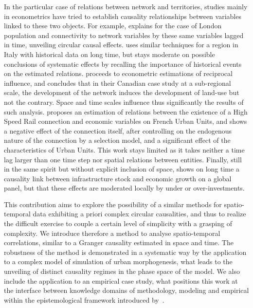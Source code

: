 \documentclass[english]{./sageo}
\begin{document}
In the particular case of relations between network and territories, studies mainly in econometrics have tried to establish causality relationships between variables linked to these two objects. For example, \cite{levinson2008density} explains for the case of London population and connectivity to network variables by these same variables lagged in time, unveiling circular causal effects. \cite{doi10.1068/b39089} uses similar techniques for a region in Italy with historical data on long time, but stays moderate on possible conclusions of systematic effects by recalling the importance of historical events on the estimated relations. \cite{cuthbert2005empirical} proceeds to econometric estimations of reciprocal influence, and concludes that in their Canadian case study at a sub-regional scale, the development of the network induces the development of land-use but not the contrary. Space and time scales influence thus significantly the results of such analysis. \cite{koninghal-00962384} proposes an estimation of relations between the existence of a High Speed Rail connection and economic variables on French Urban Units, and shows a negative effect of the connection itself, after controlling on the endogenous nature of the connection by a selection model, and a significant effect of the characteristics of Urban Units. This work stays limited as it takes neither a time lag larger than one time step nor spatial relations between entities. Finally, still in the same spirit but without explicit inclusion of space, \cite{MANCMANC1073} shows on long time a causality link between infrastructure stock and economic growth on a global panel, but that these effects are moderated locally by under or over-investments.


This contribution aims to explore the possibility of a similar methods for spatio-temporal data exhibiting a priori complex circular causalities, and thus to realize the difficult exercise to couple a certain level of simplicity with a grasping of complexity. We introduce therefore a method to analyse spatio-temporal correlations, similar to a Granger causality estimated in space and time. The robustness of the method is demonstrated in a systematic way by the application to a complex model of simulation of urban morphogenesis, what leads to the unveiling of distinct causality regimes in the phase space of the model. We also include the application to an empirical case study, what positions this work at the interface between knowledge domains of methodology, modeling and empirical within the epistemological framework introduced by~\cite{2017arXiv170609244R}.
\end{document}

